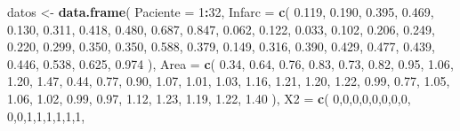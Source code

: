 \documentclass[
]{book}
\newenvironment{Shaded}{\begin{snugshade}}{\end{snugshade}}
\newcommand{\AttributeTok}[1]{\textcolor[rgb]{0.13,0.29,0.53}{#1}}
\newcommand{\DecValTok}[1]{\textcolor[rgb]{0.00,0.00,0.81}{#1}}
\newcommand{\FloatTok}[1]{\textcolor[rgb]{0.00,0.00,0.81}{#1}}
\newcommand{\FunctionTok}[1]{\textcolor[rgb]{0.13,0.29,0.53}{\textbf{#1}}}
\newcommand{\NormalTok}[1]{#1}
\newcommand{\OtherTok}[1]{\textcolor[rgb]{0.56,0.35,0.01}{#1}}
\newcommand{\SpecialCharTok}[1]{\textcolor[rgb]{0.81,0.36,0.00}{\textbf{#1}}}
\begin{document}
\begin{Shaded}
\begin{Highlighting}[]
\NormalTok{datos }\OtherTok{\textless{}{-}} \FunctionTok{data.frame}\NormalTok{(}
  \AttributeTok{Paciente =} \DecValTok{1}\SpecialCharTok{:}\DecValTok{32}\NormalTok{,}
  \AttributeTok{Infarc =} \FunctionTok{c}\NormalTok{(}
    \FloatTok{0.119}\NormalTok{, }\FloatTok{0.190}\NormalTok{, }\FloatTok{0.395}\NormalTok{, }\FloatTok{0.469}\NormalTok{, }\FloatTok{0.130}\NormalTok{, }\FloatTok{0.311}\NormalTok{, }\FloatTok{0.418}\NormalTok{, }\FloatTok{0.480}\NormalTok{,}
    \FloatTok{0.687}\NormalTok{, }\FloatTok{0.847}\NormalTok{, }\FloatTok{0.062}\NormalTok{, }\FloatTok{0.122}\NormalTok{, }\FloatTok{0.033}\NormalTok{, }\FloatTok{0.102}\NormalTok{, }\FloatTok{0.206}\NormalTok{, }\FloatTok{0.249}\NormalTok{,}
    \FloatTok{0.220}\NormalTok{, }\FloatTok{0.299}\NormalTok{, }\FloatTok{0.350}\NormalTok{, }\FloatTok{0.350}\NormalTok{, }\FloatTok{0.588}\NormalTok{, }\FloatTok{0.379}\NormalTok{, }\FloatTok{0.149}\NormalTok{, }\FloatTok{0.316}\NormalTok{,}
    \FloatTok{0.390}\NormalTok{, }\FloatTok{0.429}\NormalTok{, }\FloatTok{0.477}\NormalTok{, }\FloatTok{0.439}\NormalTok{, }\FloatTok{0.446}\NormalTok{, }\FloatTok{0.538}\NormalTok{, }\FloatTok{0.625}\NormalTok{, }\FloatTok{0.974}
\NormalTok{  ),}
  \AttributeTok{Area =} \FunctionTok{c}\NormalTok{(}
    \FloatTok{0.34}\NormalTok{, }\FloatTok{0.64}\NormalTok{, }\FloatTok{0.76}\NormalTok{, }\FloatTok{0.83}\NormalTok{, }\FloatTok{0.73}\NormalTok{, }\FloatTok{0.82}\NormalTok{, }\FloatTok{0.95}\NormalTok{, }\FloatTok{1.06}\NormalTok{,}
    \FloatTok{1.20}\NormalTok{, }\FloatTok{1.47}\NormalTok{, }\FloatTok{0.44}\NormalTok{, }\FloatTok{0.77}\NormalTok{, }\FloatTok{0.90}\NormalTok{, }\FloatTok{1.07}\NormalTok{, }\FloatTok{1.01}\NormalTok{, }\FloatTok{1.03}\NormalTok{,}
    \FloatTok{1.16}\NormalTok{, }\FloatTok{1.21}\NormalTok{, }\FloatTok{1.20}\NormalTok{, }\FloatTok{1.22}\NormalTok{, }\FloatTok{0.99}\NormalTok{, }\FloatTok{0.77}\NormalTok{, }\FloatTok{1.05}\NormalTok{, }\FloatTok{1.06}\NormalTok{,}
    \FloatTok{1.02}\NormalTok{, }\FloatTok{0.99}\NormalTok{, }\FloatTok{0.97}\NormalTok{, }\FloatTok{1.12}\NormalTok{, }\FloatTok{1.23}\NormalTok{, }\FloatTok{1.19}\NormalTok{, }\FloatTok{1.22}\NormalTok{, }\FloatTok{1.40}
\NormalTok{  ),}
  \AttributeTok{X2 =} \FunctionTok{c}\NormalTok{(}
    \DecValTok{0}\NormalTok{,}\DecValTok{0}\NormalTok{,}\DecValTok{0}\NormalTok{,}\DecValTok{0}\NormalTok{,}\DecValTok{0}\NormalTok{,}\DecValTok{0}\NormalTok{,}\DecValTok{0}\NormalTok{,}\DecValTok{0}\NormalTok{,}
    \DecValTok{0}\NormalTok{,}\DecValTok{0}\NormalTok{,}\DecValTok{1}\NormalTok{,}\DecValTok{1}\NormalTok{,}\DecValTok{1}\NormalTok{,}\DecValTok{1}\NormalTok{,}\DecValTok{1}\NormalTok{,}\DecValTok{1}\NormalTok{,}

\end{Highlighting}
\end{Shaded}
\end{document}
